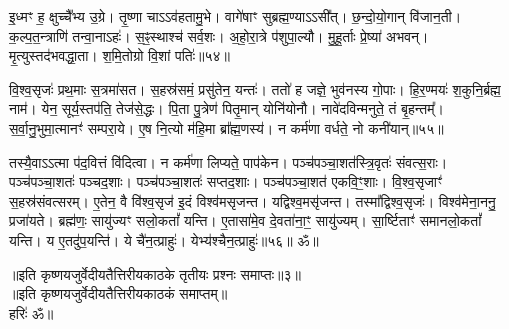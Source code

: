    इ॒ध्मꣳ ह॒ क्षुच्चै᳚भ्य उ॒ग्रे।
   तृ॒ष्णा चाऽऽव॑हतामु॒भे।
   वागे॑षाꣳ सुब्रह्म॒ण्याऽऽसी᳚त्।
   छ॒न्दो॒यो॒गान् वि॑जान॒ती।
   क॒ल्प॒त॒न्त्राणि॑ तन्वा॒नाऽहः॑।
   स॒ꣴ॒स्थाश्च॑ सर्व॒शः।
   अ॒हो॒रा॒त्रे प॑शुपा॒ल्यौ।
   मु॒हू॒र्ताः प्रे॒ष्या॑ अभवन्।
   मृ॒त्युस्तद॑भवद्धा॒ता।
   श॒मि॒तोग्रो वि॒शां पतिः॑॥५४॥

   वि॒श्व॒सृजः॑ प्रथ॒माः स॒त्रमा॑सत।
   स॒हस्र॑समं॒ प्रसु॑तेन॒ यन्तः॑।
   ततो॑ ह जज्ञे॒ भुव॑नस्य गो॒पाः।
   हि॒र॒ण्मयः॑ श॒कुनि॒र्ब्रह्म॒ नाम॑।
   येन॒ सूर्य॒स्तप॑ति॒ तेज॑से॒द्धः।
   पि॒ता पु॒त्रेण॑ पितृ॒मान् योनि॑योनौ।
   नावे॑दविन्मनुते॒ तं बृ॒हन्तम्᳚।
   स॒र्वा॒नु॒भुमा॒त्मानꣳ॑ सम्परा॒ये।
   ए॒ष नि॒त्यो म॑हि॒मा ब्रा᳚ह्म॒णस्य॑।
   न कर्म॑णा वर्धते॒ नो कनी॑यान्॥५५॥

   तस्यै॒वाऽऽत्मा प॑द॒वित्तं वि॑दित्वा।
   न कर्म॑णा लिप्यते॒ पाप॑केन।
   पञ्च॑पञ्चा॒शत॑स्त्रि॒वृतः॑ संवत्स॒राः।
   पञ्च॑पञ्चा॒शतः॑ पञ्चद॒शाः।
   पञ्च॑पञ्चा॒शतः॑ सप्तद॒शाः।
   पञ्च॑पञ्चा॒शत॑ एकवि॒ꣳ॒शाः।
   वि॒श्व॒सृजाꣳ॑ स॒हस्र॑संवत्सरम्।
   ए॒तेन॒ वै वि॑श्व॒सृज॑ इ॒दं विश्व॑मसृजन्त।
   यद्विश्व॒मसृ॑जन्त।
   तस्मा᳚द्विश्व॒सृजः॑।
   विश्व॑मेना॒ननु॒ प्रजा॑यते।
   ब्रह्म॑णः॒ सायु॑ज्यꣳ सलो॒कतां᳚ यन्ति।
   ए॒तासा॑मे॒व दे॒वता॑ना॒ꣳ॒ सायु॑ज्यम्।
   सा॒र्ष्टिताꣳ॑ समानलो॒कतां᳚ यन्ति।
   य ए॒तदु॑प॒यन्ति॑।
   ये चै॑न॒त्प्राहुः॑।
   येभ्य॑श्चैन॒त्प्राहुः॑॥५६॥
 ॐ॥
   \anuvakamend

      \begin{center}
॥इति कृष्णयजुर्वेदीयतैत्तिरीयकाठके तृतीयः प्रश्नः समाप्तः॥३॥\\
॥इति कृष्णयजुर्वेदीयतैत्तिरीयकाठकं समाप्तम्॥\\
   हरिः॑  ॐ॥
\end{center}
